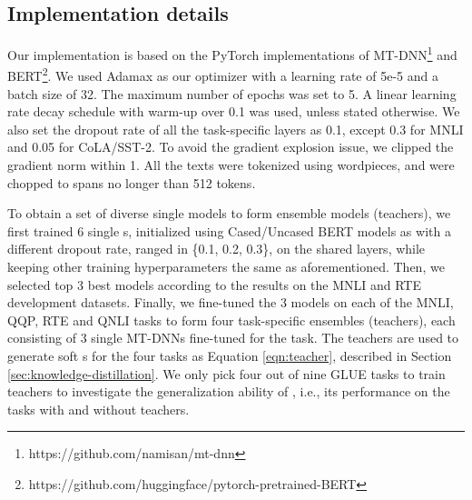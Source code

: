 \subsection{Implementation details}
\label{subsec:impl}
Our implementation is based on the PyTorch implementations of  MT-DNN\footnote{https://github.com/namisan/mt-dnn} and BERT\footnote{https://github.com/huggingface/pytorch-pretrained-BERT}.
We used Adamax \cite{kingma2014adam} as our optimizer with a learning rate of 5e-5 and a batch size of 32. The maximum number of epochs was set to 5. 
A linear learning rate decay schedule with warm-up over 0.1 was used, unless stated otherwise.
We also set the dropout rate of all the task-specific layers as 0.1, except 0.3 for MNLI and 0.05 for CoLA/SST-2. 
To avoid the gradient explosion issue, we clipped the gradient norm within 1. 
All the texts were tokenized using wordpieces, and were chopped to spans no longer than 512 tokens.


To obtain a set of diverse single models to form ensemble models (teachers), we first trained 6 single {\MNAME}s, initialized using Cased/Uncased BERT models as \cite{hancock2019snorkel} with a different dropout rate, ranged in \{0.1, 0.2, 0.3\}, on the shared layers, while keeping other training hyperparameters the same as aforementioned. 
Then, we selected top 3 best models according to the results on the MNLI and RTE development datasets. 
Finally, we fine-tuned the 3 models on each of the MNLI, QQP, RTE and QNLI tasks to form four task-specific ensembles (teachers), each consisting of 3 single MT-DNNs fine-tuned for the task.
The teachers are used to generate soft {\SLABEL}s for the four tasks as Equation \ref{eqn:teacher}, described in Section \ref{sec:knowledge-distillation}. 
We only pick four out of nine GLUE tasks to train teachers  to investigate the generalization ability of {\NMNAME}, i.e., its performance on the tasks with and without teachers.






